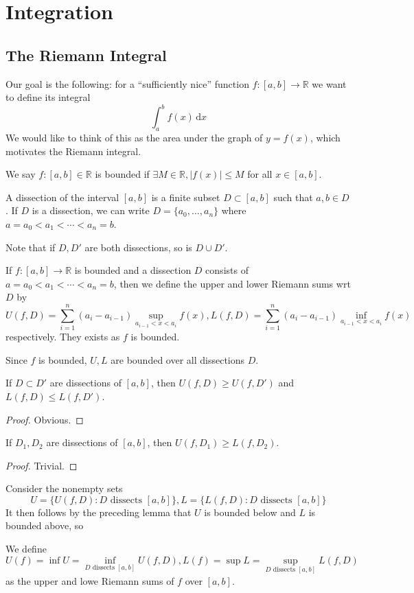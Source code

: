 \section{Integration}
\subsection{The Riemann Integral}
Our goal is the following: for a ``sufficiently nice'' function $f:[a,b]\to\mathbb R$ we want to define its integral
$$\int_a^bf(x)\,\mathrm dx$$
We would like to think of this as the area under the graph of $y=f(x)$, which motivates the Riemann integral.
\begin{definition}
    We say $f:[a,b]\in\mathbb R$ is bounded if $\exists M\in\mathbb R,|f(x)|\le M$ for all $x\in [a,b]$.
\end{definition}
\begin{definition}
    A dissection of the interval $[a,b]$ is a finite subset $D\subset [a,b]$ such that $a,b\in D$.
    If $D$ is a dissection, we can write $D=\{a_0,\ldots,a_n\}$ where $a=a_0<a_1<\cdots<a_n=b$.
\end{definition}
Note that if $D,D'$ are both dissections, so is $D\cup D'$.
\begin{definition}
    If $f:[a,b]\to\mathbb R$ is bounded and a dissection $D$ consists of $a=a_0<a_1<\cdots<a_n=b$, then we define the upper and lower Riemann sums wrt $D$ by
    $$U(f,D)=\sum_{i=1}^n(a_i-a_{i-1})\sup_{a_{i-1}<x<a_i}f(x),L(f,D)=\sum_{i=1}^n(a_i-a_{i-1})\inf_{a_{i-1}<x<a_i}f(x)$$
    respectively.
    They exists as $f$ is bounded.
\end{definition}
Since $f$ is bounded, $U,L$ are bounded over all dissections $D$.
\begin{lemma}
    If $D\subset D'$ are dissections of $[a,b]$, then $U(f,D)\ge U(f,D')$ and $L(f,D)\le L(f,D')$.
\end{lemma}
\begin{proof}
    Obvious.
\end{proof}
\begin{lemma}
    If $D_1,D_2$ are dissections of $[a,b]$, then $U(f,D_1)\ge L(f,D_2)$.
\end{lemma}
\begin{proof}
    Trivial.
\end{proof}
Consider the nonempty sets
$$U=\{U(f,D):D\text{ dissects }[a,b]\},L=\{L(f,D):D\text{ dissects }[a,b]\}$$
It then follows by the preceding lemma that $U$ is bounded below and $L$ is bounded above, so
\begin{definition}
    We define
    $$U(f)=\inf U=\inf_{D\text{ dissects }[a,b]}U(f,D),L(f)=\sup L=\sup_{D\text{ dissects }[a,b]}L(f,D)$$
    as the upper and lowe Riemann sums of $f$ over $[a,b]$.
\end{definition}
